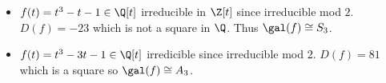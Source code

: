 \documentclass[a4paper]{article}
\begin{document}
\begin{eg}\leavevmode
  \begin{itemize}
  \item \(f(t) = t^3 - t - 1 \in \Q[t]\) irreducible in \(\Z[t]\) since irreducible mod \(2\). \(D(f) = -23\) which is not a square in \(\Q\). Thus \(\gal(f) \cong S_3\).
  \item \(f(t) = t^3 - 3t - 1 \in \Q[t]\) irredicible since irreducible mod \(2\). \(D(f) = 81\) which is a square so \(\gal(f) \cong A_3\).
  \end{itemize}
\end{eg}
\end{document}
